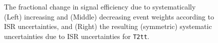 \begin{figure}[h!]
  \begin{center}
    \\
    \\
    \caption{\label{fig:sms-isr-t2tt}The fractional change in signal
      efficiency due to systematically (Left) increasing and (Middle)
      decreasing event weights according to ISR uncertainties, and
      (Right) the resulting (symmetric) systematic uncertainties due
      to ISR uncertainties for \texttt{T2tt}.}
  \end{center}
\end{figure}

